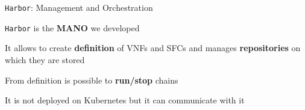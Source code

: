 \begin{frame}{\texttt{Harbor}: Management and Orchestration}

  \texttt{Harbor} is the \textbf{MANO} we developed

  \vfill{}

  It allows to create \textbf{definition} of VNFs and SFCs and manages
  \textbf{repositories} on which they are stored

  \vfill{}

  From definition is possible to \textbf{run/stop} chains

  \vfill{}

  It is not deployed on Kubernetes but it can communicate with it

  \vfill{}

\end{frame}